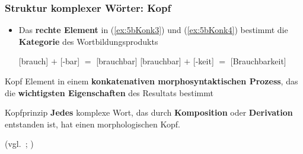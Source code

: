 \begin{frame}
\frametitle{Struktur komplexer Wörter: Kopf}


\begin{itemize}
	\item Das \textbf{rechte Element} in (\ref{ex:5bKonk3}) und (\ref{ex:5bKonk4}) bestimmt die \textbf{Kategorie} des Wortbildungsprodukts %
	
\ea 
	\ea\label{ex:5bKonk3} {[brauch] $+$ [-bar] $=$ [brauchbar]}
	\ex\label{ex:5bKonk4} {[brauchbar] $+$ [-keit] $=$ [Brauchbarkeit]}
	\z 
\z 

\end{itemize}

\pause 
	
\begin{block}{Kopf}
	Element in einem \textbf{konkatenativen morphosyntaktischen Prozess}, das die \textbf{wichtigsten Eigenschaften} des Resultats bestimmt

\end{block}	

\pause 

\begin{block}{Kopfprinzip}
	\textbf{Jedes} komplexe Wort, das durch \textbf{Komposition} oder \textbf{Derivation} entstanden ist, hat einen morphologischen Kopf.
\end{block}	

\hfill (vgl.\ \citealp[76]{Olsen86a}; \citealp[]{MyP18b})
	
\end{frame}


